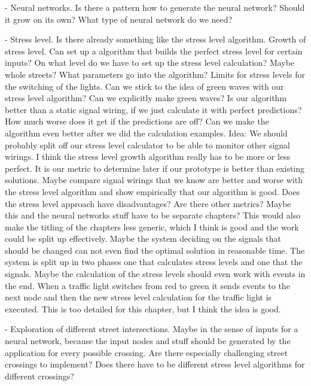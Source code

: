 - Neural networks. Is there a pattern how to  generate the neural network? Should it grow on its own? What type of neural network do we need?

- Stress level. Is there already something like the stress level algorithm. Growth of stress level. Can set up a algorithm that builds the perfect stress level for certain inputs? On what level do we have to set up the stress level calculation? Maybe whole streets? What parameters go into the algorithm? Limits for stress levels for the switching of the lights. Can we stick to the idea of green waves with our stress level algorithm? Can we explicitly make green waves? Is our algorithm better than a static signal wiring, if we just calculate it with perfect predictions? How much worse does it get if the predictions are off? Can we make the algorithm even better after we did the calculation examples. Idea: We should probably split off our stress level calculator to be able to monitor other signal wirings. I think the stress level growth algorithm really has to be more or less perfect. It is our metric to determine later if our prototype is better than existing solutions. Maybe compare signal wirings that we know are better and worse with the stress level algorithm and show empirically that our algorithm is good. Does the stress level approach have disadvantages? Are there other metrics? Maybe this and the neural networks stuff have to be separate chapters? This would also make the titling of the chapters less generic, which I think is good and the work could be split up effectively. Maybe the system deciding on the signals that should be changed can not even find the optimal solution in reasonable time. The system is split up in two phases one that calculates stress levels and one that the signals. Maybe the calculation of the stress levels should even work with events in the end. When a traffic light switches from red to green it sends events to the next node and then the new stress level calculation for the traffic light is executed. This is too detailed for this chapter, but I think the idea is good.

- Exploration of different street intersections. Maybe in the sense of inputs for a neural network, because the input nodes and stuff should be generated by the application for every possible crossing. Are there especially challenging street crossings to implement? Does there have to be different stress level algorithms for different crossings?

